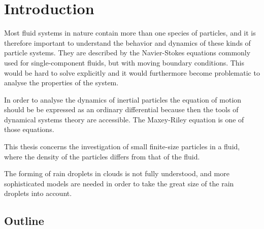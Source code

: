 \chapter{Introduction}

Most fluid systems in nature contain more than one species of particles, and it is therefore important to understand the behavior and dynamics of these kinds of particle systems. They are described by the Navier-Stokes equations commonly used for single-component fluids, but with moving boundary conditions. This would be hard to solve explicitly and it would furthermore become problematic to analyse the properties of the system.


In order to analyse the dynamics of inertial particles the equation of motion should be be expressed as an ordinary differential because then the tools of dynamical systems theory are accessible. The Maxey-Riley equation is one of those equations. 


This thesis concerns the investigation of small finite-size particles in a fluid, where the density of the 
particles differs from that of the fluid. 


The forming of rain droplets in clouds is not fully understood, and more sophisticated models are needed in order to take the great size of the rain droplets into account. 

\section{Outline}
